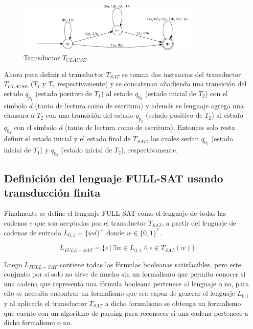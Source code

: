 \begin{figure}[h]
    \includegraphics[width=0.8\textwidth]{Graphics/transductor.png}
    \caption{Transductor $T_{CLAUSE}$.}
    \label{fig:transducer} %
\end{figure}

Ahora para definir el transductor $T_{SAT}$ se toman dos instancias del transductor $T_{CLAUSE}$ ($T_1$ y $T_2$ respectivamente) y se concatenan
añadiendo una transición del estado $q_{p_1}$ (estado positivo de $T_1$) al estado $q_{0_2}$ (estado inicial de $T_2$) con el símbolo $d$ (tanto de
lectura como de escritura) y además se lenguaje agrega una clausura a $T_2$ con una transición del estado $q_{p_2}$
(estado positivo de $T_2$) al estado $q_{0_2}$ con el símbolo $d$ (tanto de lectura como de escritura). Entonces solo resta definir
el estado inicial y el estado final de $T_{SAT}$, los cuales serían $q_{0_1}$ (estado inicial de $T_1$) y $q_{0_2}$ (estado inicial de $T_2$),
respectivamente.

\subsection{Definición del lenguaje FULL-SAT usando transducción finita}

Finalmente se define el lenguaje FULL-SAT como el lenguaje de todas las cadenas $e$ que son aceptadas por el transductor $T_{SAT}$, a partir del lenguaje
de cadenas de entrada $L_{0,1}=\{wd\}^+$ donde $w\in \{0,1\}^*$. 

$$L_{FULL-SAT} = \{e\,|\,\exists w \in L_{0,1} \wedge e \in T_{SAT}(w) \}$$

Luego $L_{FULL-SAT}$ contiene todas las fórmulas booleanas satisfacibles, pero este conjunto por si solo no sirve de mucho sin un formalismo
que permita conocer si una cadena que representa una fórmula booleana pertenece al lenguaje o no, para ello se necesita encontrar un formalismo que sea capaz
de generar el lenguaje $L_{0,1}$ y al aplicarle el transductor $T_{SAT}$ a dicho formalismo se obtenga un formalismo que cuente con un algoritmo de parsing
para reconocer si una cadena pertenece a dicho formalismo o no.

